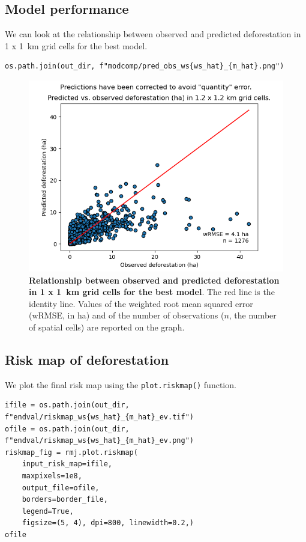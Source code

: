 \documentclass[paper=a4, 12pt, DIV=12]{scrartcl}
\begin{document}
\subsection{Model performance}
\label{sec:org75327bd}

We can look at the relationship between observed and predicted deforestation in 1 x 1 km grid cells for the best model.

\begin{verbatim}
os.path.join(out_dir, f"modcomp/pred_obs_ws{ws_hat}_{m_hat}.png")
\end{verbatim}

\begin{figure}[H]
\centering
\includegraphics[width=0.8\linewidth]{outputs/modcomp/pred_obs_ws5_ei.png}
\caption{\label{fig:org3781ddb}\textbf{Relationship between observed and predicted deforestation in 1 x 1 km grid cells for the best model}. The red line is the identity line. Values of the weighted root mean squared error (wRMSE, in ha) and of the number of observations (\(n\), the number of spatial cells) are reported on the graph.}
\end{figure}

\subsection{Risk map of deforestation}
\label{sec:orga49e1c2}

We plot the final risk map using the \texttt{plot.riskmap()} function.

\begin{verbatim}
ifile = os.path.join(out_dir, f"endval/riskmap_ws{ws_hat}_{m_hat}_ev.tif")
ofile = os.path.join(out_dir, f"endval/riskmap_ws{ws_hat}_{m_hat}_ev.png")
riskmap_fig = rmj.plot.riskmap(
    input_risk_map=ifile,
    maxpixels=1e8,
    output_file=ofile,
    borders=border_file,
    legend=True,
    figsize=(5, 4), dpi=800, linewidth=0.2,)
ofile
\end{verbatim}
\end{document}

